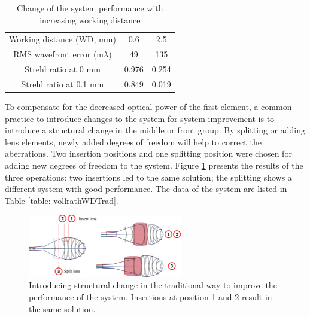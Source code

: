 \setlength{\arrayrulewidth}{.5mm}
\setlength{\tabcolsep}{18pt}
\renewcommand{\arraystretch}{1.2}
\begin{table}[h!]
    \centering
    \captionsetup{justification=centering}
    \caption{Change of the system performance with increasing working distance}
    \label{table: vollrathWDchange}
    \vspace{-1em}
    \begin{tabular}{ c c c }
    \hline 
     Working distance (WD, mm) & 0.6 & 2.5\\ 
     \cmidrule{2-3}
    RMS wavefront error (m$\lambda$) & 49 & 135  \\ 
    Strehl ratio at 0 mm & 0.976 & 0.254\\
    Strehl ratio at 0.1 mm & 0.849 & 0.019\\
    \hline
    \end{tabular}
\end{table}

To compensate for the decreased optical power of the first element, a common practice to introduce changes to the system for system improvement is to introduce a structural change in the middle or front group. By splitting or adding lens elements, newly added degrees of freedom will help to correct the aberrations. Two insertion positions and one splitting position were chosen for adding new degrees of freedom to the system. Figure \ref{fig: vollrathWDTrad} presents the results of the three operations: two insertions led to the same solution; the splitting shows a different system with good performance. The data of the system are listed in Table \ref{table: vollrathWDTrad}.

\begin{figure}[h!]
    \centering
    \includegraphics[width=0.6\textwidth]{chapter-4/figures/vollrathWDTrad.png}
    \caption{Introducing structural change in the traditional way to improve the performance of the system. Insertions at position \textcircled{\scriptsize{1}} and \textcircled{\scriptsize{2}} result in the same solution. }
    \label{fig: vollrathWDTrad}
\end{figure}

